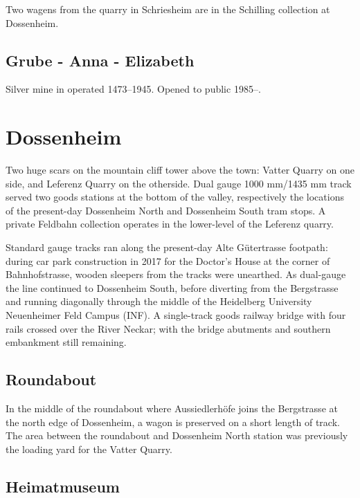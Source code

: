 \documentclass[a4paper]{report}
\begin{document}
Two wagens from the quarry in Schriesheim are in the Schilling collection at Dossenheim.\cite{Katzenberger-Ruf-2015}


\subsection{Grube - Anna - Elizabeth}

Silver mine in operated 1473--1945.  Opened to public 1985--.\cite[``Geschichte'']{Anna-Elizabeth}

\section{Dossenheim}

Two huge scars on the mountain cliff tower above the town: Vatter
Quarry on one side, and Leferenz Quarry on the otherside.  Dual gauge
1000 mm/1435 mm track served two goods stations at the bottom of the
valley, respectively the locations of the present-day Dossenheim North
and Dossenheim South tram stops.  A private Feldbahn collection
operates in the lower-level of the Leferenz quarry.

Standard gauge tracks ran along the present-day Alte Gütertrasse
footpath: during car park construction in 2017 for the Doctor's House
at the corner of Bahnhofstrasse, wooden sleepers from the tracks were
unearthed.  As dual-gauge the line continued to Dossenheim South,
before diverting from the Bergstrasse and running diagonally through
the middle of the Heidelberg University Neuenheimer Feld Campus (INF).
A single-track goods railway bridge with four rails crossed over the
River Neckar; with the bridge abutments and southern embankment still remaining.

\subsection{Roundabout}

In the middle of the roundabout where Aussiedlerhöfe joins the
Bergstrasse at the north edge of Dossenheim, a wagon is preserved on a
short length of track.  The area between the roundabout and Dossenheim
North station was previously the loading yard for the Vatter Quarry.

\subsection{Heimatmuseum}
\end{document}
